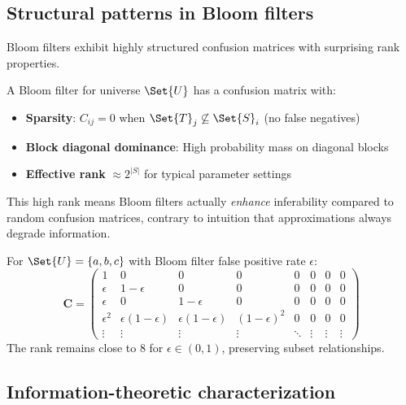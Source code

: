 \documentclass[ ../main.tex]{subfiles}
\begin{document}
\subsection{Structural patterns in Bloom filters}

Bloom filters exhibit highly structured confusion matrices with surprising rank properties.

\begin{theorem}
\label{thm:bloom_rank}
A Bloom filter for universe $\Set{U}$ has a confusion matrix with:
\begin{itemize}
\item \textbf{Sparsity}: $C_{ij} = 0$ when $\Set{T}_j \not\subseteq \Set{S}_i$ (no false negatives)
\item \textbf{Block diagonal dominance}: High probability mass on diagonal blocks
\item \textbf{Effective rank} $\approx 2^{|S|}$ for typical parameter settings
\end{itemize}
\end{theorem}

This high rank means Bloom filters actually \emph{enhance} inferability compared to random confusion matrices, contrary to intuition that approximations always degrade information.

\begin{example}
For $\Set{U} = \{a, b, c\}$ with Bloom filter false positive rate $\epsilon$:
\begin{equation}
\mathbf{C} = \begin{pmatrix}
1 & 0 & 0 & 0 & 0 & 0 & 0 & 0 \\
\epsilon & 1-\epsilon & 0 & 0 & 0 & 0 & 0 & 0 \\
\epsilon & 0 & 1-\epsilon & 0 & 0 & 0 & 0 & 0 \\
\epsilon^2 & \epsilon(1-\epsilon) & \epsilon(1-\epsilon) & (1-\epsilon)^2 & 0 & 0 & 0 & 0 \\
\vdots & \vdots & \vdots & \vdots & \ddots & \vdots & \vdots & \vdots
\end{pmatrix}
\end{equation}
The rank remains close to 8 for $\epsilon \in (0, 1)$, preserving subset relationships.
\end{example}

\subsection{Information-theoretic characterization}
\end{document}
